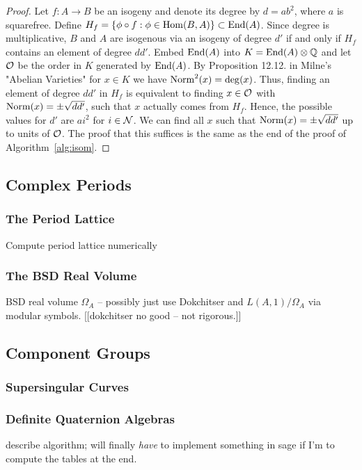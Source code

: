 \documentclass{article}
\begin{document}
\begin{proof}
Let $f:A \to B$ be an isogeny and denote its degree by $d = ab^2$, where $a$ is
squarefree. Define $H_f = \{\phi \circ f: \phi \in
\operatorname{Hom}(B,A)\} \subset \operatorname{End}(A)$. Since degree is multiplicative, $B$ and $A$ are
isogenous via an isogeny of degree $d'$ if and only if $H_f$ contains an element
of degree $d d'$. Embed
$\operatorname{End}(A)$ into $K = \operatorname{End}(A) \otimes \mathbb{Q}$ and let $\mathcal{O}$ be the order in $K$
generated by $\operatorname{End}(A)$. By Proposition 12.12. in Milne's "Abelian Varieties"
for $x \in K$ we have $\operatorname{Norm}^2(x) = \deg(x)$. Thus, finding an element of
degree $dd'$ in $H_f$ is equivalent to finding $x \in \mathcal{O}$ with $\operatorname{Norm}(x) =
\pm \sqrt{dd'}$, such that $x$ actually comes from $H_f$. Hence, the possible
values for $d'$ are $a i^2$ for $i \in \mathcal{N}$. We can find all $x$
such that $\operatorname{Norm}(x) = \pm \sqrt{dd'}$ up to units of $\mathcal{O}$.
The proof that this suffices is the same as the end of the
proof of Algorithm~\ref{alg:isom}.
\end{proof}


\subsection{Complex Periods}


\subsubsection{The Period Lattice}
Compute period lattice numerically

\subsubsection{The BSD Real Volume}
BSD real volume $\Omega_A$ -- possibly just use Dokchitser and
$L(A,1)/\Omega_A$ via modular symbols.  [[dokchitser no good -- not rigorous.]]

\subsection{Component Groups}


\subsubsection{Supersingular Curves}

\subsubsection{Definite Quaternion Algebras}
describe algorithm; will finally {\em have} to implement
something in sage if I'm to compute the tables at the end.
\end{document}
